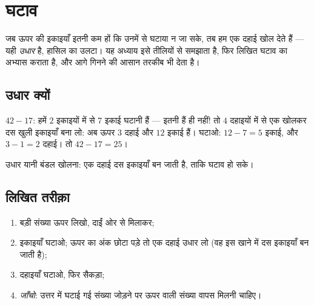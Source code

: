 \chapter{घटाव}\label{ch:g2:subtraction}

जब ऊपर की इकाइयाँ इतनी कम हों कि उनमें से घटाया न जा सके, तब हम
एक दहाई खोल देते हैं --- यही \emph{उधार} है, हासिल का उलटा। यह
अध्याय इसे तीलियों से समझाता है, फिर लिखित घटाव का अभ्यास कराता
है, और आगे गिनने की आसान तरकीब भी देता है।

\section{उधार क्यों}

\begin{example}[दहाई खोलना]\label{ex:g2:subtraction:unbundle}
$42 - 17$: हमें $2$ इकाइयों में से $7$ इकाई घटानी हैं --- इतनी
हैं ही नहीं! तो $4$ दहाइयों में से एक खोलकर दस खुली इकाइयाँ बना
लो: अब ऊपर $3$ दहाई और $12$ इकाई हैं। घटाओ: $12 - 7 = 5$ इकाई,
और $3 - 1 = 2$ दहाई। तो $42 - 17 = 25$।
\end{example}

\begin{omfigure}

{\small उधार यानी बंडल खोलना: एक दहाई दस इकाइयाँ बन जाती है,
ताकि घटाव हो सके।}
\end{omfigure}

\section{लिखित तरीक़ा}

\begin{method}[खानों में घटाव]\label{met:g2:subtraction:column}
\begin{enumerate}
  \item बड़ी संख्या ऊपर लिखो, दाईं ओर से मिलाकर;
  \item इकाइयाँ घटाओ; ऊपर का अंक छोटा पड़े तो एक दहाई उधार लो
        (वह इस खाने में दस इकाइयाँ बन जाती है);
  \item दहाइयाँ घटाओ, फिर सैकड़ा;
  \item \emph{जाँचो}: उत्तर में घटाई गई संख्या जोड़ने पर ऊपर
        वाली संख्या वापस मिलनी चाहिए।
\end{enumerate}
\end{method}

